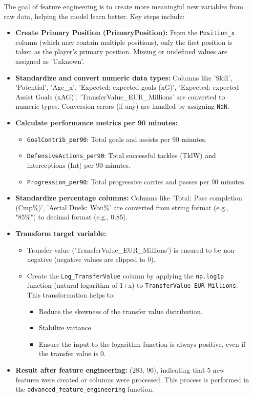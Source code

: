 \documentclass[12pt, a4paper]{report}
\begin{document}
The goal of feature engineering is to create more meaningful new variables from raw data, helping the model learn better. Key steps include:
\begin{itemize}
    \item \textbf{Create Primary Position (PrimaryPosition):} From the \texttt{Position\_x} column (which may contain multiple positions), only the first position is taken as the player's primary position. Missing or undefined values are assigned as 'Unknown'.
    \item \textbf{Standardize and convert numeric data types:} Columns like 'Skill', 'Potential', 'Age\_x', 'Expected: expected goals (xG)', 'Expected: expected Assist Goals (xAG)', 'TransferValue\_EUR\_Millions' are converted to numeric types. Conversion errors (if any) are handled by assigning \texttt{NaN}.
    \item \textbf{Calculate performance metrics per 90 minutes:}
    \begin{itemize}
        \item \texttt{GoalContrib\_per90}: Total goals and assists per 90 minutes.
        \item \texttt{DefensiveActions\_per90}: Total successful tackles (TklW) and interceptions (Int) per 90 minutes.
        \item \texttt{Progression\_per90}: Total progressive carries and passes per 90 minutes.
    \end{itemize}
    \item \textbf{Standardize percentage columns:} Columns like 'Total: Pass completion (Cmp\%)', 'Aerial Duels: Won\%' are converted from string format (e.g., "85\%") to decimal format (e.g., 0.85).
    \item \textbf{Transform target variable:}
    \begin{itemize}
        \item Transfer value ('TransferValue\_EUR\_Millions') is ensured to be non-negative (negative values are clipped to 0).
        \item Create the \texttt{Log\_TransferValue} column by applying the \texttt{np.log1p} function (natural logarithm of 1+x) to \texttt{TransferValue\_EUR\_Millions}. This transformation helps to:
        \begin{itemize}
            \item Reduce the skewness of the transfer value distribution.
            \item Stabilize variance.
            \item Ensure the input to the logarithm function is always positive, even if the transfer value is 0.
        \end{itemize}
    \end{itemize}
    \item \textbf{Result after feature engineering:} (283, 90), indicating that 5 new features were created or columns were processed. This process is performed in the \texttt{advanced\_feature\_engineering} function.
\end{itemize}
\end{document}
